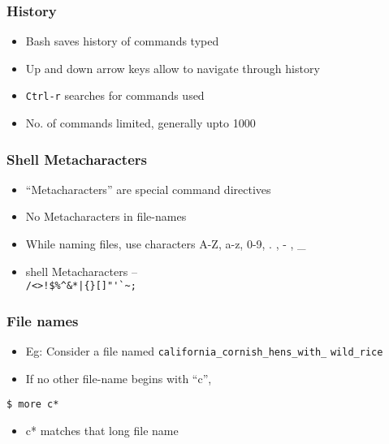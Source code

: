 \documentclass[17pt,compress]{beamer}
\begin{document}
\begin{frame}[fragile]
\frametitle{History}
\begin{itemize}
\item Bash saves history of commands typed
\item Up and down arrow keys allow to navigate through history
\item \texttt{Ctrl-r} searches for commands used
\item No. of commands limited, generally upto 1000
\end{itemize}
\end{frame}

\begin{frame}[fragile]
  \frametitle{Shell Metacharacters}
  \begin{itemize}
  \item ``Metacharacters''  are special command directives
  \item No Metacharacters in file-names
  \item While naming files, use characters A-Z, a-z, 0-9, . , - , \_
  \item shell Metacharacters -- \\
             \verb+/<>!$%^&*|{}[]"'`~;+
  \end{itemize}
\end{frame}

\begin{frame}[fragile]
  \frametitle{File names}
  \begin{itemize}
\item Eg: Consider a file named \verb+california_cornish_hens_with_+
\verb+wild_rice+
\item If no other file-name begins with ``c'', 
\end{itemize}
\hspace{29pt}\verb~$ more c*~
\begin{itemize}
\item c* matches that long file name
\end{itemize}
\end{frame}
\end{document}
